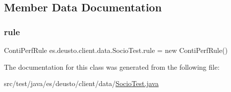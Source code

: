 \subsection{Member Data Documentation}
\mbox{\label{classes_1_1deusto_1_1client_1_1data_1_1_socio_test_ac422397a4a43c86bbb36c25630706751}} 
\subsubsection{\texorpdfstring{rule}{rule}}
{\footnotesize\ttfamily Conti\+Perf\+Rule es.\+deusto.\+client.\+data.\+Socio\+Test.\+rule = new Conti\+Perf\+Rule()}



The documentation for this class was generated from the following file\+:\begin{DoxyCompactItemize}
\item 
src/test/java/es/deusto/client/data/\mbox{\hyperlink{_socio_test_8java}{Socio\+Test.\+java}}\end{DoxyCompactItemize}
